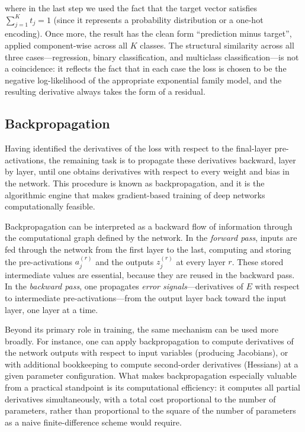 where in the last step we used the fact that the target vector satisfies $\sum_{j=1}^K t_j = 1$ (since it represents a probability distribution or a one-hot encoding). Once more, the result has the clean form ``prediction minus target'', applied component-wise across all $K$ classes. The structural similarity across all three cases---regression, binary classification, and multiclass classification---is not a coincidence: it reflects the fact that in each case the loss is chosen to be the negative log-likelihood of the appropriate exponential family model, and the resulting derivative always takes the form of a residual.

\subsection*{Backpropagation}

Having identified the derivatives of the loss with respect to the final-layer pre-activations, the remaining task is to propagate these derivatives backward, layer by layer, until one obtains derivatives with respect to every weight and bias in the network. This procedure is known as \alert{backpropagation}, and it is the algorithmic engine that makes gradient-based training of deep networks computationally feasible.

Backpropagation can be interpreted as a backward flow of information through the computational graph defined by the network. In the \emph{forward pass}, inputs are fed through the network from the first layer to the last, computing and storing the pre-activations $a_j^{(r)}$ and the outputs $z_j^{(r)}$ at every layer $r$. These stored intermediate values are essential, because they are reused in the backward pass. In the \emph{backward pass}, one propagates \emph{error signals}---derivatives of $E$ with respect to intermediate pre-activations---from the output layer back toward the input layer, one layer at a time.

Beyond its primary role in training, the same mechanism can be used more broadly. For instance, one can apply backpropagation to compute derivatives of the network outputs with respect to input variables (producing Jacobians), or with additional bookkeeping to compute second-order derivatives (Hessians) at a given parameter configuration. What makes backpropagation especially valuable from a practical standpoint is its computational efficiency: it computes all partial derivatives simultaneously, with a total cost proportional to the number of parameters, rather than proportional to the square of the number of parameters as a naive finite-difference scheme would require.

